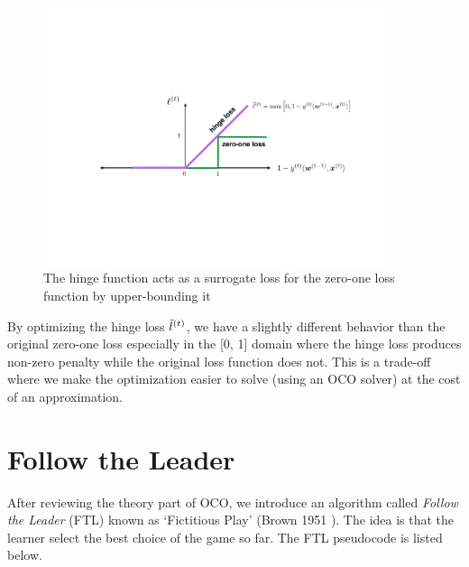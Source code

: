 \documentclass[11pt]{article}
\newcommand{\argmin}[1]{\underset{#1}{\operatorname{arg}\,\operatorname{min}}\;}
\begin{document}
\begin{addmargin}[2em]{2em}
\begin{figure}[h]
    \centering
    \includegraphics[width=0.9\textwidth]{figure/surrogate_loss_hinge.pdf}
    \caption{The hinge function acts as a surrogate loss for the zero-one loss function by upper-bounding it}
    \label{fig:surrogate_loss_hinge}
\end{figure}

By optimizing the hinge loss $\Tilde{l}^{(t)}$, we have a slightly different behavior than the original zero-one loss especially in the [0, 1] domain where the hinge loss produces non-zero penalty while the original loss function does not. This is a trade-off where we make the optimization easier to solve (using an OCO solver) at the cost of an approximation.

\end{addmargin}

\section{Follow the Leader}
After reviewing the theory part of OCO, we introduce an algorithm called \textit{Follow the Leader} (FTL) known as `Fictitious Play' (Brown 1951 \cite{berger2007brown}). The idea is that the learner select the best choice of the game so far. The FTL pseudocode is listed below.

\end{document}
